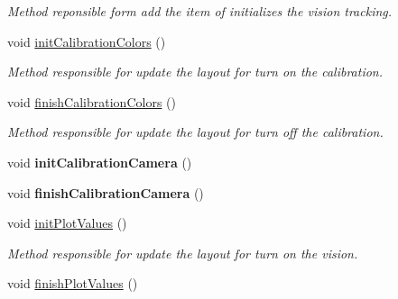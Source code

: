 \begin{DoxyCompactItemize}
\begin{DoxyCompactList}\small\item\em Method reponsible form add the item of initializes the vision tracking. \end{DoxyCompactList}\item 
void \hyperlink{classMainWindow_ab514a3e2e2feb11fe562bb5f5687c260}{init\+Calibration\+Colors} ()\hypertarget{classMainWindow_ab514a3e2e2feb11fe562bb5f5687c260}{}\label{classMainWindow_ab514a3e2e2feb11fe562bb5f5687c260}

\begin{DoxyCompactList}\small\item\em Method responsible for update the layout for turn on the calibration. \end{DoxyCompactList}\item 
void \hyperlink{classMainWindow_aaed408509f0ec209d5113b6d838f223a}{finish\+Calibration\+Colors} ()\hypertarget{classMainWindow_aaed408509f0ec209d5113b6d838f223a}{}\label{classMainWindow_aaed408509f0ec209d5113b6d838f223a}

\begin{DoxyCompactList}\small\item\em Method responsible for update the layout for turn off the calibration. \end{DoxyCompactList}\item 
void {\bfseries init\+Calibration\+Camera} ()\hypertarget{classMainWindow_afcee03b23b74fc2730a43c282130ed3f}{}\label{classMainWindow_afcee03b23b74fc2730a43c282130ed3f}

\item 
void {\bfseries finish\+Calibration\+Camera} ()\hypertarget{classMainWindow_a535252d6997fbf9460ab40a072900a56}{}\label{classMainWindow_a535252d6997fbf9460ab40a072900a56}

\item 
void \hyperlink{classMainWindow_afe574227eabad29af617957c1c74f11f}{init\+Plot\+Values} ()\hypertarget{classMainWindow_afe574227eabad29af617957c1c74f11f}{}\label{classMainWindow_afe574227eabad29af617957c1c74f11f}

\begin{DoxyCompactList}\small\item\em Method responsible for update the layout for turn on the vision. \end{DoxyCompactList}\item 
void \hyperlink{classMainWindow_a71bb19c8988c81c52cf8856295584ff5}{finish\+Plot\+Values} ()\hypertarget{classMainWindow_a71bb19c8988c81c52cf8856295584ff5}{}\label{classMainWindow_a71bb19c8988c81c52cf8856295584ff5}


\end{DoxyCompactItemize}

